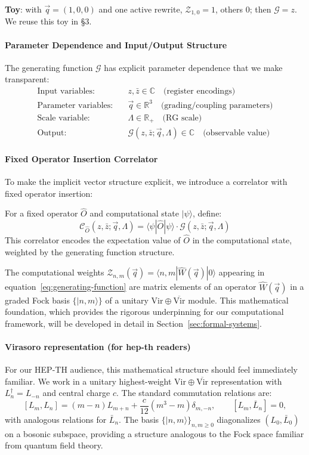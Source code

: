 \textbf{Toy}: with $\vec{q}=(1,0,0)$ and one active rewrite, $\mathcal{Z}_{1,0}=1$, others $0$; then $\mathcal{G}=z$. We reuse this toy in §3.

\paragraph{Parameter Dependence and Input/Output Structure}
The generating function $\mathcal{G}$ has explicit parameter dependence that we make transparent:
\begin{align}
\text{Input variables:} \quad & z, \bar{z} \in \mathbb{C} \quad \text{(register encodings)} \\
\text{Parameter variables:} \quad & \vec{q} \in \mathbb{R}^3 \quad \text{(grading/coupling parameters)} \\
\text{Scale variable:} \quad & \Lambda \in \mathbb{R}_+ \quad \text{(RG scale)} \\
\text{Output:} \quad & \mathcal{G}(z,\bar{z};\vec{q},\Lambda) \in \mathbb{C} \quad \text{(observable value)}
\end{align}

\paragraph{Fixed Operator Insertion Correlator}
To make the implicit vector structure explicit, we introduce a correlator with fixed operator insertion:
\begin{definition}
\label{def:fixed-operator-correlator}
For a fixed operator $\hat{O}$ and computational state $|\psi\rangle$, define:
\[
\mathcal{C}_{\hat{O}}(z,\bar{z};\vec{q},\Lambda) = \langle\psi|\hat{O}|\psi\rangle \cdot \mathcal{G}(z,\bar{z};\vec{q},\Lambda)
\]
This correlator encodes the expectation value of $\hat{O}$ in the computational state, weighted by the generating function structure.
\end{definition}

The computational weights $\mathcal{Z}_{n,m}(\vec{q})=\langle n,m|\hat{W}(\vec{q})|0\rangle$ appearing in equation~\eqref{eq:generating-function} are matrix elements of an operator $\hat{W}(\vec{q})$ in a graded Fock basis $\{|n,m\rangle\}$ of a unitary $\text{Vir}\oplus\overline{\text{Vir}}$ module. This mathematical foundation, which provides the rigorous underpinning for our computational framework, will be developed in detail in Section~\ref{sec:formal-systems}.

\paragraph{Virasoro representation (for hep-th readers)}
For our HEP-TH audience, this mathematical structure should feel immediately familiar. We work in a unitary highest-weight $\mathrm{Vir}\oplus\overline{\mathrm{Vir}}$ representation with $L_n^\dagger=L_{-n}$ and central charge $c$. The standard commutation relations are:
\[
[L_m,L_n]=(m-n)L_{m+n}+\frac{c}{12}(m^3-m)\delta_{m,-n},\qquad [L_m,\bar{L}_n]=0,
\]
with analogous relations for $\bar{L}_n$. The basis $\{|n,m\rangle\}_{n,m\ge0}$ diagonalizes $(L_0,\bar{L}_0)$ on a bosonic subspace, providing a structure analogous to the Fock space familiar from quantum field theory.

